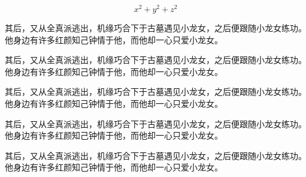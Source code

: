 \documentclass[print, doctor, vlined]{DissertUESTC}
\begin{document}
\begin{longtable}{p{2em} p{4.5em}}
	\end{longtable}
	

	\begin{equation}
		x^2 + y^2 + z^2
	\end{equation}
	


	\begin{definition}[名称]
		其后，又从全真派逃出，机缘巧合下于古墓遇见小龙女，之后便跟随小龙女练功。他身边有许多红颜知己钟情于他，而他却一心只爱小龙女。
	\end{definition}

	\begin{axiom}[名称]
		其后，又从全真派逃出，机缘巧合下于古墓遇见小龙女，之后便跟随小龙女练功。他身边有许多红颜知己钟情于他，而他却一心只爱小龙女。
	\end{axiom}
	
	\begin{theorem}[名称]
		其后，又从全真派逃出，机缘巧合下于古墓遇见小龙女，之后便跟随小龙女练功。他身边有许多红颜知己钟情于他，而他却一心只爱小龙女。
	\end{theorem}
	
	\begin{proposition}[名称]
		其后，又从全真派逃出，机缘巧合下于古墓遇见小龙女，之后便跟随小龙女练功。他身边有许多红颜知己钟情于他，而他却一心只爱小龙女。
	\end{proposition}
	
	\begin{corollary}[名称]
		其后，又从全真派逃出，机缘巧合下于古墓遇见小龙女，之后便跟随小龙女练功。他身边有许多红颜知己钟情于他，而他却一心只爱小龙女。
	\end{corollary}
	
\end{document}
